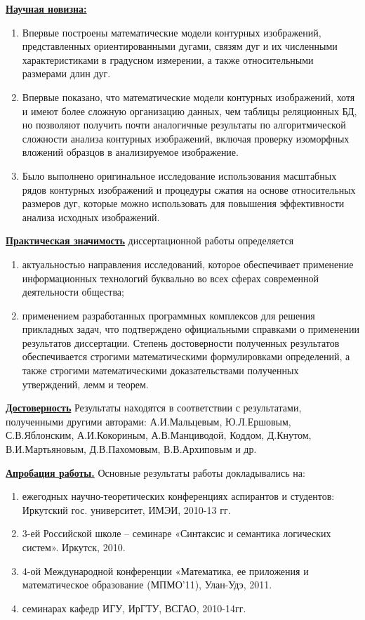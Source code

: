 \noindent
\underline{\textbf{Научная новизна:}}
\begin{enumerate}
\item Впервые построены математические модели контурных изображений, представленных ориентированными дугами, связям дуг и их численными характеристиками в градусном измерении,  а также  относительными размерами  длин дуг.  
\item Впервые  показано, что математические модели контурных изображений, хотя и имеют более сложную организацию данных, чем  таблицы реляционных БД, но позволяют получить почти аналогичные результаты по алгоритмической сложности  анализа контурных изображений, включая проверку изоморфных вложений образцов в анализируемое изображение.
\item Было выполнено оригинальное исследование использования масштабных рядов контурных изображений и процедуры сжатия на  основе относительных размеров дуг, которые можно использовать для повышения эффективности анализа исходных изображений.
\end{enumerate}
\noindent
\underline{\textbf{Практическая значимость}} диссертационной работы определяется
\begin{enumerate}
\item актуальностью направления исследований, которое обеспечивает применение информационных технологий буквально во всех сферах современной деятельности общества;
\item применением разработанных программных комплексов для решения прикладных задач, что подтверждено официальными справками о применении результатов диссертации.
Степень достоверности полученных результатов обеспечивается строгими математическими формулировками определений, а также строгими математическими доказательствами полученных утверждений, лемм и теорем.
\end{enumerate}

\noindent
\underline{\textbf{Достоверность}} Результаты находятся в соответствии с результатами, полученными другими авторами: А.И.Мальцевым, Ю.Л.Ершовым, С.В.Яблонским, А.И.Кокориным, А.В.Манциводой,  Коддом, Д.Кнутом, В.И.Мартьяновым, Д.В.Пахомовым, В.В.Архиповым и др.

\noindent
\underline{\textbf{Апробация работы.}}
Основные результаты работы докладывались на: 
\begin{enumerate}
	\item ежегодных научно-теоретических конференциях аспирантов и студентов:  Иркутский  гос. университет, ИМЭИ, 2010-13 гг.
	\item 3-ей Российской школе – семинаре «Синтаксис и семантика логических систем». Иркутск, 2010.
	\item 4-ой Международной конференции «Математика, ее приложения и математическое образование (МПМО’11),  Улан-Удэ, 2011.
	\item семинарах кафедр ИГУ, ИрГТУ, ВСГАО, 2010-14гг.
\end{enumerate}

